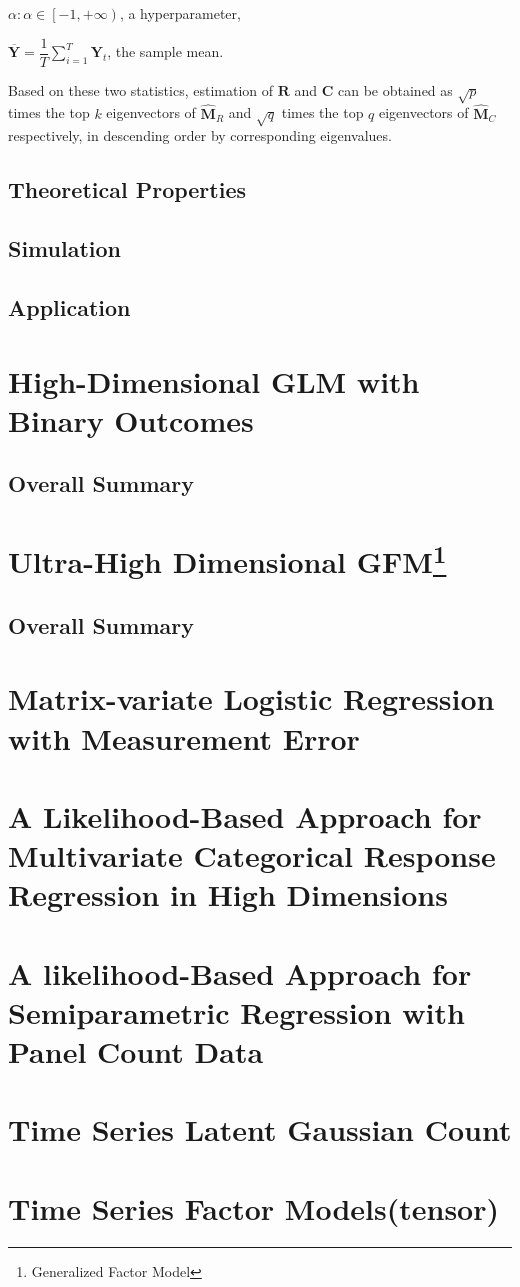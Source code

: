\documentclass{article}[12pt]
\begin{document}
$\alpha: \alpha \in \left[-1,+\infty \right)$, a hyperparameter,

$\mathbf{\overline{Y}}=\dfrac{1}{T} \sum\limits_{i=1}^T\mathbf{Y}_t$, the sample mean.

Based on these two statistics, estimation of $\mathbf{R}$ and $\mathbf{C}$ can be obtained as $\sqrt{p}$ times the top $k$ eigenvectors of $\widehat{\mathbf{M}}_R$ and $\sqrt{q}$ times the top $q$ eigenvectors of $\widehat{\mathbf{M}}_C$ respectively, in descending order by corresponding eigenvalues.

\subsection{Theoretical Properties}

 

\subsection{Simulation}

\subsection{Application}
\section{High-Dimensional GLM with Binary Outcomes}
\subsection{Overall Summary}
\section [Ultra-High Dimensional GFM]{Ultra-High Dimensional GFM\footnote{Generalized Factor Model}} 
\subsection{Overall Summary} 

\section{Matrix-variate Logistic Regression with Measurement Error}
\section{A Likelihood-Based Approach for Multivariate Categorical Response Regression in High Dimensions}
\section{A likelihood-Based Approach for Semiparametric Regression with Panel Count Data}


\section{Time Series Latent Gaussian Count}
\section{Time Series Factor Models(tensor)}   
\end{document}
